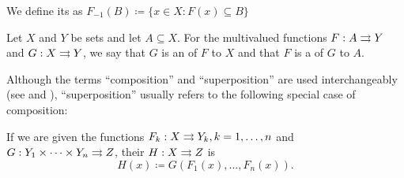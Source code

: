 \begin{definition}
\begin{DefEnum}[resume=def:function]
    We define its  as \( F_{-1}(B) \coloneqq \{ x \in X \colon F(x) \subseteq B \} \)

     Let \( X \) and \( Y \) be sets and let \( A \subseteq X \). For the multivalued functions \( F: A \rightrightarrows Y \) and \( G: X \rightrightarrows Y \), we say that \( G \) is an  of \( F \) to \( X \) and that \( F \) is a  of \( G \) to \( A \).

     Although the terms \enquote{composition} and \enquote{superposition} are used interchangeably (see \cite[44]{Enderton1977} and \cite[]{Фихтенгольц1968/1}), \enquote{superposition} usually refers to the following special case of composition:

    If we are given the functions \( F_k: X \rightrightarrows Y_k, k = 1, \ldots, n \) and \( G: Y_1 \times \cdots \times Y_n \rightrightarrows Z \), their  \( H: X \rightrightarrows Z \) is
    \begin{equation*}
      H(x) \coloneqq G(F_1(x), \ldots, F_n(x)).
    \end{equation*}
  \end{DefEnum}
\end{definition}

